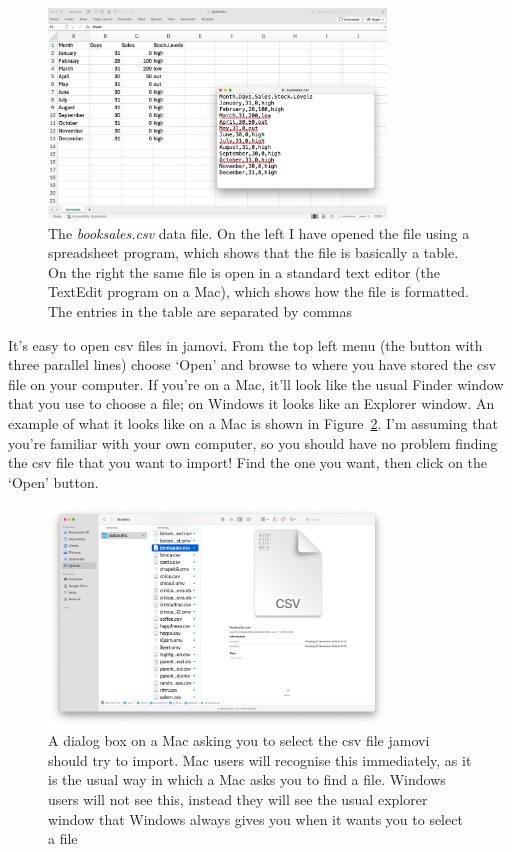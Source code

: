 \documentclass[
  a4paper,
]{book}
\begin{document}
\begin{figure}

\includegraphics[width=0.8\textwidth,height=\textheight]{images/fig3-4.png} \hfill{}

\caption{\label{fig-fig3-4}The \emph{booksales.csv} data file. On the
left I have opened the file using a spreadsheet program, which shows
that the file is basically a table. On the right the same file is open
in a standard text editor (the TextEdit program on a Mac), which shows
how the file is formatted. The entries in the table are separated by
commas}

\end{figure}

It's easy to open csv files in jamovi. From the top left menu (the
button with three parallel lines) choose `Open' and browse to where you
have stored the csv file on your computer. If you're on a Mac, it'll
look like the usual Finder window that you use to choose a file; on
Windows it looks like an Explorer window. An example of what it looks
like on a Mac is shown in Figure~\ref{fig-fig3-5}. I'm assuming that
you're familiar with your own computer, so you should have no problem
finding the csv file that you want to import! Find the one you want,
then click on the `Open' button.

\begin{figure}

\includegraphics[width=0.8\textwidth,height=\textheight]{images/fig3-5.png} \hfill{}

\caption{\label{fig-fig3-5}A dialog box on a Mac asking you to select
the csv file jamovi should try to import. Mac users will recognise this
immediately, as it is the usual way in which a Mac asks you to find a
file. Windows users will not see this, instead they will see the usual
explorer window that Windows always gives you when it wants you to
select a file}

\end{figure}
\end{document}
